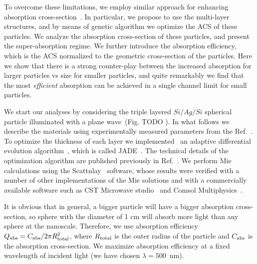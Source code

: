 \documentclass[aps,prl,twocolumn,showpacs,superscriptaddress,groupedaddress]{revtex4-1}
\begin{document}
To overcome these limitations, we employ similar approach for
enhancing absorption cross-section~\cite{Fan-2011}. In particular, we
propose to use the multi-layer structures, and by means of genetic
algorithm we optimize the ACS of these particles. We analyze the
absorption cross-section of these particles, and present the
super-absorption regime. We further introduce the absorption
efficiency, which is the ACS normalized to the geometric cross-section
of the particles. Here we show that there is a strong counter-play
between the increased absorption for larger particles vs size for
smaller particles, and quite remarkably we find that the most {\em
  efficient} absorption can be achieved in a single channel limit for
small particles.

We start our analyses by considering the triple layered $Si/Ag/Si$
spherical particle illuminated with a plane wave~(Fig. TODO ). In what
follows we describe the materials using experimentally measured
parameters from the Ref.~\cite{palik-1997}.  To optimize the thickness of each
layer we implemented~\cite{JADE-web} an adaptive differential
evolution algorithm~\cite{Storn-DE-first-1997}, which is called
JADE~\cite{Jingqiao-JADE-2009}.  The technical details of the
optimization algorithm are published previously in
Ref.~\cite{Ladutenko-2014}. We perform Mie calculations using the
Scattnlay~\cite{Pena-scattnlay-2009,Scattnlay-web} software, whose results were
verified with a number of other implementations of the Mie solutions
and with a commercially available software such as CST Microwave
studio~\cite{CST-web} and Comsol Multiphysics~\cite{Comsol-web}.

It is obvious that in general, a bigger particle will have a bigger
absorption cross-section, so sphere with the diameter of 1 cm will
absorb more light than any sphere at the nanoscale. Therefore, we use
absorption efficiency $Q_{\rm abs}=C_{\rm abs}/2\pi R_{\rm total}^2$,
where $R_{\rm total}$ is the outer radius of the particle and $C_{\rm
  abs}$ is the absorption cross-section. We maximize absorption
efficiency at a fixed wavelength of incident light (we have chosen
$\lambda=500$~nm).
\end{document}
